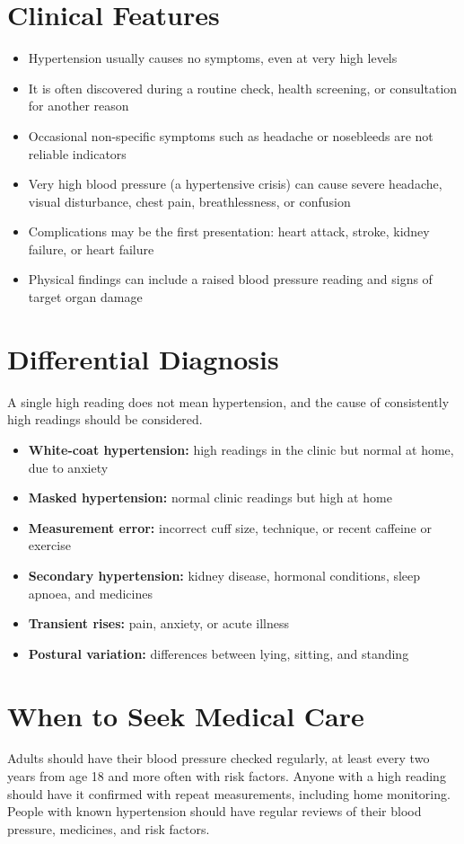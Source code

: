 \section*{Clinical Features}
\begin{itemize}
    \item Hypertension usually causes no symptoms, even at very high levels
    \item It is often discovered during a routine check, health screening, or consultation for another reason
    \item Occasional non-specific symptoms such as headache or nosebleeds are not reliable indicators
    \item Very high blood pressure (a hypertensive crisis) can cause severe headache, visual disturbance, chest pain, breathlessness, or confusion
    \item Complications may be the first presentation: heart attack, stroke, kidney failure, or heart failure
    \item Physical findings can include a raised blood pressure reading and signs of target organ damage
\end{itemize}

\section*{Differential Diagnosis}
A single high reading does not mean hypertension, and the cause of consistently high readings should be considered.
\begin{itemize}
    \item \textbf{White-coat hypertension:} high readings in the clinic but normal at home, due to anxiety
    \item \textbf{Masked hypertension:} normal clinic readings but high at home
    \item \textbf{Measurement error:} incorrect cuff size, technique, or recent caffeine or exercise
    \item \textbf{Secondary hypertension:} kidney disease, hormonal conditions, sleep apnoea, and medicines
    \item \textbf{Transient rises:} pain, anxiety, or acute illness
    \item \textbf{Postural variation:} differences between lying, sitting, and standing
\end{itemize}

\section*{When to Seek Medical Care}
Adults should have their blood pressure checked regularly, at least every two years from age 18 and more often with risk factors. Anyone with a high reading should have it confirmed with repeat measurements, including home monitoring. People with known hypertension should have regular reviews of their blood pressure, medicines, and risk factors.

